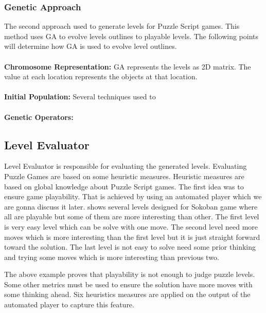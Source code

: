 \subsubsection{Genetic Approach}
The second approach used to generate levels for Puzzle Script games. This method uses GA to evolve levels outlines to playable levels. The following points will determine how GA is used to evolve level outlines.\\\\
\textbf{Chromosome Representation:} GA represents the levels as 2D matrix. The value at each location represents the objects at that location.\\\\
\textbf{Initial Population:} Several techniques used to \\\\
\textbf{Genetic Operators:}
\subsection{Level Evaluator}
Level Evaluator is responsible for evaluating the generated levels. Evaluating Puzzle Games are based on some heuristic measures. Heuristic measures are based on global knowledge about Puzzle Script games. The first idea was to ensure game playability. That is achieved by using an automated player which we are gonna discuss it later.  shows several levels designed for Sokoban game where all are playable but some of them are more interesting than other. The first level is very easy level which can be solve with one move. The second level need more moves which is more interesting than the first level but it is just straight forward toward the solution. The last level is not easy to solve need some prior thinking and trying some moves which is more interesting than previous two.


The above example proves that playability is not enough to judge puzzle levels. Some other metrics must be used to ensure the solution have more moves with some thinking ahead. Six heuristics measures are applied on the output of the automated player to capture this feature.

